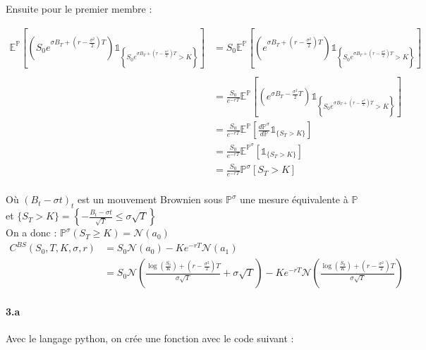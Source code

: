 \documentclass[a4paper,10pt]{report}
\begin{document}
Ensuite pour le premier membre :

$$
\begin{aligned}
\mathbb{E}^{\mathbb{P}}\left[    \left(S_{0} e^{\sigma B_{T}+\left(r-\frac{\sigma^{2}}{2}\right) T}\right)\mathds{1}_{\left\{S_{0} e^{\sigma B_{T}+\left(r-\frac{\sigma^{2}}{2}\right) T} > K \right\}} \right] & = S_{0} \mathbb{E}^{\mathbb{P}}\left[\left( e^{\sigma B_{T}+\left(r-\frac{\sigma^{2}}{2}\right) T} \right) \mathds{1}_{\left\{S_{0} e^{\sigma B_{T}+\left(r-\frac{\sigma^{2}}{2}\right) T} > K \right\}}\right] \\
& \\
& = \frac{S_{0}}{e^{-rT}} \mathbb{E}^{\mathbb{P}}\left[\left( e^{\sigma B_{T}-\frac{\sigma^{2}}{2} T} \right) \mathds{1}_{\left\{S_{0} e^{\sigma B_{T}+\left(r-\frac{\sigma^{2}}{2}\right) T} > K \right\}}\right] \\
& = \frac{S_0}{e^{-rT}}\mathbb{E}^{\mathbb{P}}\left[  \frac{d\mathbb{P}^\sigma}{d\mathbb{P}} \mathds{1}_{\{ S_T > K\}}   \right] \\
& = \frac{S_0}{e^{-rT}}\mathbb{E}^{\mathbb{P}^\sigma}\left[ \mathds{1}_{\{ S_T > K\}}   \right] \\
& = \frac{S_0}{e^{-rT}} \mathbb{P}^\sigma \left[ S_T > K   \right] \\
\end{aligned}
$$

Où $(B_t - \sigma t)_{t}$ est un mouvement Brownien sous $\mathbb{P}^\sigma$ une mesure équivalente à $\mathbb{P}$ et $\{S_T > K\} = \left\{    -  \frac{B_t - \sigma t}{\sqrt{T}} \leq \sigma \sqrt{T} \right\}$ \\
\newline
On a donc : $\mathbb{P}^\sigma (S_T \geq K) = \mathcal{N}\left(a_0 \right) $\\
$$
\begin{aligned}
C^{B S}\left(S_{0}, T, K, \sigma, r\right) & = S_0 \mathcal{N}\left(a_0 \right) - K e^{-rT}  \mathcal{N} \left(a_1\right) \\
& =S_0 \mathcal{N}\left(\frac{\log\left( {\frac{S_0}{K}} \right) + \left( r-\frac{\sigma^{2}}{2} \right) T}{\sigma \sqrt{T}}  + \sigma \sqrt{T} \right) -  K e^{-rT}  \mathcal{N} \left(\frac{\log\left( {\frac{S_0}{K}} \right) + \left( r-\frac{\sigma^{2}}{2} \right) T}{\sigma \sqrt{T}}\right)
\end{aligned}
$$

\paragraph*{3.a} Avec le langage python, on crée une fonction avec le code suivant :
\end{document}
